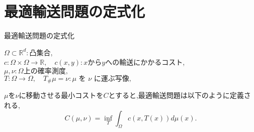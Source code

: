 \documentclass[aspectratio=169, dvipdfmx, 12pt]{beamer}
\begin{document}
\begin{comment}

\begin{frame}{研究背景}
\begin{tikzpicture}
\begin{axis}[
    ymin=0.5,
    ymax=-0.5,
    xmin=-10,
    xmax=10,
    samples=50,
    domain=-10:10,
]
\addplot[blue, thick, smooth] {-1/(2*pi)^(1/2) * exp(-(x+5)^2/(2))};
    

\addplot[green, thick, fill=green!30, fill opacity=0.5,
    domain={3:4},
    restrict y to domain=-1:0,
    samples=50,
    ] {ifthenelse((3 < x) && (x < 4), -1/(2*pi)^(1/2) * exp(-(x+5)^2/2), 0)};
    
 \addplot[blue, thick, smooth] {1/(2*pi)^(1/2) * exp(-(x-5)^2/(2))};
\end{axis}
\end{tikzpicture}
\end{frame}
\end{comment}




\section{最適輸送問題の定式化}
\begin{frame}{最適輸送問題の定式化}
    \begin{block}{}
        $\Omega  \subset \mathbb{R}^d: \text{凸集合}$,\\
        $c: \Omega \times \Omega \to \mathbb{R}, \quad c(x, y) : x \text{から$y$への輸送にかかるコスト}$, \\
        $\mu, \nu : \Omega \text{上の確率測度},$\\
        $T: \Omega \to \Omega, \quad T_\#\mu = \nu: \text{$\mu$ を $\nu$ に運ぶ写像},$
        \vspace{\baselineskip} 

        $\mu$を$\nu$に移動させる最小コストを$C$とすると,最適輸送問題は以下のように定義される,
        \begin{equation*}
            C(\mu, \nu) = \inf_T \int_\Omega c(x, T(x)) d \mu (x).
        \end{equation*}

    \end{block}
\end{frame}

\end{document}
